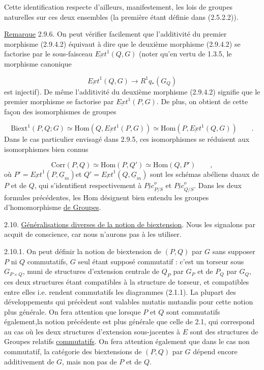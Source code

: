 
Cette identification respecte d'ailleurs, manifestement, les lois de groupes naturelles sur ces deux ensembles (la première étant définie dans (2.5.2.2)).

\underline{Remarque} 2.9.6. On peut vérifier facilement que l'additivité du premier morphisme (2.9.4.2) équivaut à dire que le deuxième morphisme (2.9.4.2) se factorise par le sous-faisceau $\underline{Ext}^1(Q,G)$ (noter qu'en vertu de 1.3.5, le morphisme canonique

\begin{equation*}
\underline{Ext}^1(Q,G) \longrightarrow R^1q_*(G_Q)
\end{equation*}
est injectif). De même l'additivité du deuxième morphisme (2.9.4.2) signifie que le premier morphisme se factorise par $\underline{Ext}^1(P,G)$. De plus, on obtient de cette façon des isomorphismes de groupes

\begin{equation}\tag{2.9.6.1}
\mathrm{Biext}^{1}(P,Q;G) \simeq \mathrm{Hom}(Q,\underline{Ext}^1(P,G)) \simeq \mathrm{Hom}(P,\underline{Ext}^1(Q,G)) \qquad .
\end{equation}
Dans le cas particulier envisagé dans 2.9.5, ces isomorphismes se réduisent aux isomorphismes bien connus

\begin{equation}\tag{2.9.6.2}
\mathrm{Corr}(P,Q) \simeq \mathrm{Hom}(P,Q') \simeq \mathrm{Hom}(Q,P') \qquad ,
\end{equation}
où $P' = \underline{Ext}^1(P,\underline{G}_m)$et $Q' = \underline{Ext}^1(Q,\underline{G}_m)$ sont les schémas abéliens duaux de $P$ et de $Q$, qui s'identifient respectivement à $\underline{Pic}^o_{P/S}$ et $\underline{Pic}^o_{Q/S}$. Dans les deux formules précédentes, les Hom désignent bien entendu les groupes d'homomorphisme \underline{de Groupes}.

2.10.  \underline{Généralisations diverses de la notion de biextension}. Nous les signalons par acquit de conscience, car nous n'aurons pas à les utiliser.

2.10.1. On peut définir la notion de biextension  de $(P,Q)$ par $G$ sans supposer $P$ ni $Q$ commutatifs, $G$ seul étant supposé commutatif : c'est un
torseur sous $G_{P\times Q}$, muni de structures d'extension centrale de $Q_P$ par $G_P$ et de $P_Q$ par $G_Q$, ces deux structures étant compatibles à la structure de torseur, et compatibles entre elles i.e. rendent commutatifs les diagrammes (2.1.1). La plupart des développements qui précèdent sont valables mutatis mutandis pour cette notion plus générale. On fera attention que lorsque $P$ et $Q$ sont commutatifs également,la notion précédente est    plus générale que celle de 2.1, qui correspond au cas où les deux structures d'extension sous-jacentes à $E$ sont des structures de Groupes relatifs \underline{commutatifs}. On fera attention également que dans le cas non commutatif, la catégorie des biextensions de $(P,Q)$ par $G$ dépend encore additivement de $G$, mais non pas de $P$ et de $Q$.

